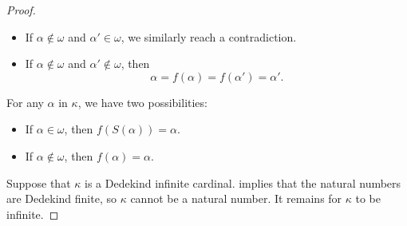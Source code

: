 \begin{proof}
\begin{itemize}
    \item If \( \alpha \not\in \omega \) and \( \alpha' \in \omega \), we similarly reach a contradiction.

    \item If \( \alpha \not\in \omega \) and \( \alpha' \not\in \omega \), then
    \begin{equation*}
      \alpha = f(\alpha) = f(\alpha') = \alpha'.
    \end{equation*}
  \end{itemize}

   For any \( \alpha \) in \( \kappa \), we have two possibilities:
  \begin{itemize}
    \item If \( \alpha \in \omega \), then \( f(S(\alpha)) = \alpha \).
    \item If \( \alpha \not\in \omega \), then \( f(\alpha) = \alpha \).
  \end{itemize}

  \NecessitySubProof Suppose that \( \kappa \) is a Dedekind infinite cardinal.  implies that the natural numbers are Dedekind finite, so \( \kappa \) cannot be a natural number. It remains for \( \kappa \) to be infinite.
\end{proof}

